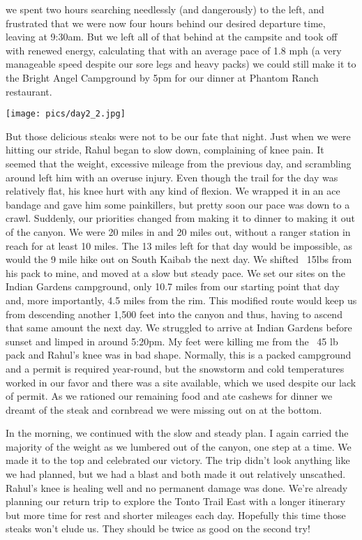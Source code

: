 \documentclass[10pt,a4paper]{article}
\newenvironment{Figure}
  {\par\medskip\noindent\minipage{\linewidth}}
  {\endminipage\par\medskip}
\begin{document}
\begin{multicols}{2}
we spent two hours searching needlessly (and dangerously) to the left, and frustrated that we were now four hours behind our desired departure time, leaving at 9:30am. But we left all of that behind at the campsite and took off with renewed energy, calculating that with an average pace of 1.8 mph (a very manageable speed despite our sore legs and heavy packs) we could still make it to the Bright Angel Campground by 5pm for our dinner at Phantom Ranch restaurant. 

\begin{Figure}
 \centering
 \texttt{[image: pics/day2\_2.jpg]}
\end{Figure}

But those delicious steaks were not to be our fate that night. Just when we were hitting our stride, Rahul began to slow down, complaining of knee pain. It seemed that the weight, excessive mileage from the previous day, and scrambling around left him with an overuse injury. Even though the trail for the day was relatively flat, his knee hurt with any kind of flexion. We wrapped it in an ace bandage and gave him some painkillers, but pretty soon our pace was down to a crawl. Suddenly, our priorities changed from making it to dinner to making it out of the canyon. We were 20 miles in and 20 miles out, without a ranger station in reach for at least 10 miles. The 13 miles left for that day would be impossible, as would the 9 mile hike out on South Kaibab the next day. We shifted ~15lbs from his pack to mine, and moved at a slow but steady pace. We set our sites on the Indian Gardens campground, only 10.7 miles from our starting point that day and, more importantly, 4.5 miles from the rim. This modified route would keep us from descending another 1,500 feet into the canyon and thus, having to ascend that same amount the next day. We struggled to arrive at Indian Gardens before sunset and limped in around 5:20pm.  My feet were killing me from the ~45 lb pack and Rahul's knee was in bad shape. Normally, this is a packed campground and a permit is required year-round, but the snowstorm and cold temperatures worked in our favor and there was a site available, which we used despite our lack of permit. As we rationed our remaining food and ate cashews for dinner we dreamt of the steak and cornbread we were missing out on at the bottom. 

In the morning, we continued with the slow and steady plan. I again carried the majority of the weight as we lumbered out of the canyon, one step at a time. We made it to the top and celebrated our victory. The trip didn't look anything like we had planned, but we had a blast and both made it out relatively unscathed. Rahul's knee is healing well and no permanent damage was done. We're already planning our return trip to explore the Tonto Trail East with a longer itinerary but more time for rest and shorter mileages each day. Hopefully this time those steaks won't elude us. They should be twice as good on the second try! 


\end{multicols}
\end{document}
